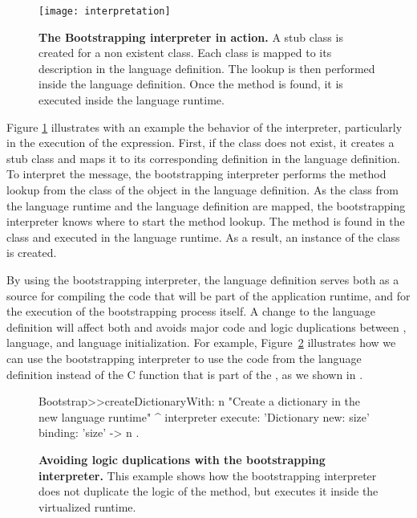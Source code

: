 \begin{figure}[!ht]
\center
\texttt{[image: interpretation]}
\caption{\textbf{The Bootstrapping interpreter in action.} A stub class is created for a non existent class. Each class is mapped to its description in the language definition. The lookup is then performed inside the language definition. Once the method is found, it is executed inside the language runtime.\label{fig:interpretation}}
\end{figure}

Figure \ref{fig:interpretation} illustrates with an example the behavior of the interpreter, particularly in the execution of the  expression. First, if the class  does not exist, it creates a stub  class and maps it to its corresponding definition in the language definition. To interpret the  message, the bootstrapping interpreter performs the method lookup from the class of the object in the language definition. As the class from the language runtime and the language definition are mapped, the bootstrapping interpreter knows where to start the method lookup. The method is found in the  class and executed in the language runtime. As a result, an instance of the  class is created.

By using the bootstrapping interpreter, the language definition serves both as a source for compiling the code that will be part of the application runtime, and for the execution of the bootstrapping process itself. A change to the language definition will affect both and avoids major code and logic duplications between \VM, language, and language initialization. For example, Figure~\ref{code:logic_dup3} illustrates how we can use the bootstrapping interpreter to use the  code from the language definition instead of the C function that is part of the \VM, as we shown in .


\begin{figure}[ht]
\begin{code}
Bootstrap>>createDictionaryWith: n
    "Create a dictionary in the new language runtime"
    ^ interpreter
            execute: 'Dictionary new: size'
            binding: { 'size' -> n }.
\end{code}
\caption{\textbf{Avoiding logic duplications with the bootstrapping interpreter.} This example shows how the bootstrapping interpreter does not duplicate the logic of the  method, but executes it inside the virtualized runtime.\label{code:logic_dup3}}
\end{figure}


